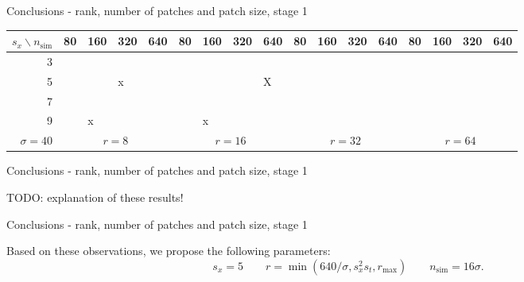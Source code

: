 \documentclass[mathserif, 8pt]{beamer}
\makeatletter
\newcounter{multipleslide}
\newcommand{\restoreframe}{%
\patchcmd{\beamer@@tmpl@footline}%
	{\themultipleslide}%
	{\insertframenumber}%
	{}%
	{}%
\setcounter{framenumber}{\value{multipleslide}}%
}
\makeatother
\begin{document}
\begin{frame}{Conclusions - rank, number of patches and patch size, stage 1}
\begin{center}
		\medskip

		{\small
		\begin{tabular}{r ||p{.1cm}|p{.1cm}|p{.1cm}|p{.1cm}||p{.1cm}|p{.1cm}|p{.1cm}|p{.1cm}||p{.1cm}|p{.1cm}|p{.1cm}|p{.1cm}||p{.1cm}|p{.1cm}|p{.1cm}|p{.1cm}||}
				$s_x \backslash n_{\text{sim}}$  & {\tiny 80} & {\tiny 160} & {\tiny 320} & {\tiny 640} & {\tiny 80} & {\tiny 160} & {\tiny 320} & {\tiny 640} & {\tiny 80} & {\tiny 160} & {\tiny 320} & {\tiny 640} & {\tiny 80} & {\tiny 160} & {\tiny 320} & {\tiny 640} \\\hline
		  3 &  &  &  &  &  &  &  &  &  &  &  &  &  &  &  &  \\[.1cm]\hline
		  5 &  &  &x &  &  &  &  &X &  &  &  &  &  &  &  &  \\[.1cm]\hline
		  7 &  &  &  &  &  &  &  &  &  &  &  &  &  &  &  &  \\[.1cm]\hline
		  9 &  &x &  &  &  &x &  &  &  &  &  &  &  &  &  &  \\[.1cm]\hline
		$\sigma=40$& \multicolumn{4}{c||}{$r =  8$} & 
		\multicolumn{4}{c||}{$r = 16$} & 
		\multicolumn{4}{c||}{$r = 32$} & 
		\multicolumn{4}{c||}{$r = 64$} 
		\end{tabular}}
	\end{center}

\end{frame}

\begin{frame}{Conclusions - rank, number of patches and patch size, stage 1}

	TODO: explanation of these results!

\end{frame}

\begin{frame}{Conclusions - rank, number of patches and patch size, stage 1}
	\begin{center}
	Based on these observations, we propose the following parameters:
	\[s_x = 5 \quad\quad r = \min(640/\sigma,s_x^2s_t,r_{\text{max}})\quad\quad n_{\text{sim}} = 16\sigma.\]
	\end{center}
\end{frame}
\restoreframe
\end{document}
